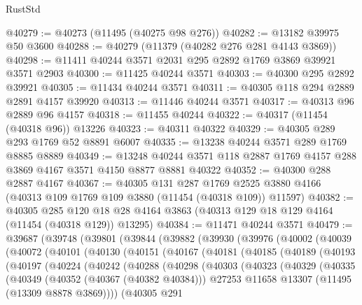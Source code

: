 \begin{lexlean}{RustStd}
\begin{coremodule}
@40279 := @40273 (@11495 (@40275 @98 @276))
@40282 := @13182 @39975 @50 @3600
@40288 := @40279 (@11379 (@40282 @276 @281 @4143 @3869))
@40298 := @11411 @40244 @3571 @2031 @295 @2892 @1769 @3869 @39921 @3571 @2903
@40300 := @11425 @40244 @3571
@40303 := @40300 @295 @2892 @39921
@40305 := @11434 @40244 @3571
@40311 := @40305 @118 @294 @2889 @2891 @4157 @39920
@40313 := @11446 @40244 @3571
@40317 := @40313 @96 @2889 @96 @4157
@40318 := @11455 @40244
@40322 := @40317 (@11454 (@40318 @96)) @13226
@40323 := @40311 @40322
@40329 := @40305 @289 @293 @1769 @52 @8891 @6007
@40335 := @13238 @40244 @3571 @289 @1769 @8885 @8889
@40349 := @13248 @40244 @3571 @118 @2887 @1769 @4157 @288 @3869 @4167 @3571 @4150 @8877 @8881 @40322
@40352 := @40300 @288 @2887 @4167
@40367 := @40305
    @131
    @287
    @1769
    @2525
    @3880
    @4166
    (@40313 @109 @1769 @109 @3880 (@11454 (@40318 @109)) @11597)
@40382 := @40305
    @285
    @120
    @18
    @28
    @4164
    @3863
    (@40313 @129 @18 @129 @4164 (@11454 (@40318 @129)) @13295)
@40384 := @11471 @40244 @3571
@40479 := @39687
    (@39748
      (@39801
        (@39844
          (@39882
            (@39930
              (@39976
                (@40002
                  (@40039
                    (@40072
                      (@40101
                        (@40130
                          (@40151
                            (@40167
                              (@40181
                                (@40185
                                  (@40189
                                    (@40193
                                      (@40197
                                        (@40224
                                          (@40242
                                            (@40288
                                              (@40298
                                                (@40303
                                                  (@40323
                                                    (@40329
                                                      (@40335
                                                        (@40349
                                                          (@40352 (@40367 (@40382 @40384)))
                                                          @27253
                                                          @11658
                                                          @13307
                                                          (@11495 (@13309 @8878 @3869))))
                                                      (@40305
                                                        @291

\end{coremodule}
\end{lexlean}
